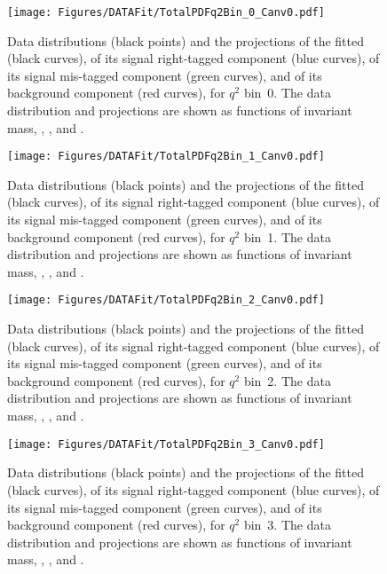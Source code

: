 \begin{figure}
  \centering
  \texttt{[image: Figures/DATAFit/TotalPDFq2Bin\_0\_Canv0.pdf]}
  \caption{Data distributions (black points) and the projections of the fitted \pdf (black curves), of its signal right-tagged component (blue curves), of its signal mis-tagged component (green curves), and of its background component (red curves), for $q^2$ bin~0.
    The data distribution and \pdf projections are shown as functions of \PBz invariant mass, \cTL, \cTK, and \PHI.}
  \label{fig:res_bin0}
\end{figure}

\begin{figure}
  \centering
  \texttt{[image: Figures/DATAFit/TotalPDFq2Bin\_1\_Canv0.pdf]}
  \caption{Data distributions (black points) and the projections of the fitted \pdf (black curves), of its signal right-tagged component (blue curves), of its signal mis-tagged component (green curves), and of its background component (red curves), for $q^2$ bin~1.
    The data distribution and \pdf projections are shown as functions of \PBz invariant mass, \cTL, \cTK, and \PHI.}
  \label{fig:res_bin1}
\end{figure}


\begin{figure}
  \centering
  \texttt{[image: Figures/DATAFit/TotalPDFq2Bin\_2\_Canv0.pdf]}
  \caption{Data distributions (black points) and the projections of the fitted \pdf (black curves), of its signal right-tagged component (blue curves), of its signal mis-tagged component (green curves), and of its background component (red curves), for $q^2$ bin~2.
    The data distribution and \pdf projections are shown as functions of \PBz invariant mass, \cTL, \cTK, and \PHI.}
  \label{fig:res_bin2}
\end{figure}

\begin{figure}
  \centering
  \texttt{[image: Figures/DATAFit/TotalPDFq2Bin\_3\_Canv0.pdf]}
  \caption{Data distributions (black points) and the projections of the fitted \pdf (black curves), of its signal right-tagged component (blue curves), of its signal mis-tagged component (green curves), and of its background component (red curves), for $q^2$ bin~3.
    The data distribution and \pdf projections are shown as functions of \PBz invariant mass, \cTL, \cTK, and \PHI.}
  \label{fig:res_bin3}
\end{figure}

